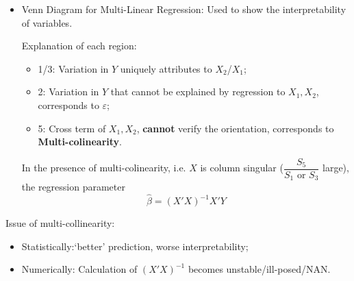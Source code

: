 \begin{itemize}[topsep=2pt,itemsep=2pt]
    \item Venn Diagram for Multi-Linear Regression: Used to show the interpretability of variables.
    
    \begin{center}
    \end{center}

    Explanation of each region:
    \begin{itemize}[topsep=2pt,itemsep=2pt]
        \item 1/3: Variation in $ Y $ uniquely attributes to $ X_2 $/$ X_1 $;
        \item 2: Variation in $ Y $ that cannot be explained by regression to $ X_1,X_2 $, corresponds to $ \varepsilon  $;
        \item 5: Cross term of $ X_1,X_2 $, \textbf{cannot} verify the orientation, corresponds to \textbf{Multi-colinearity}.
    \end{itemize}

    In the presence of multi-colinearity, i.e. $ X $ is column singular ($ \dfrac{S_5}{S_1\text{ or }S_3} $ large), the regression parameter
    \begin{equation}
        \hat{\beta }=(X'X)^{-1}X'Y
    \end{equation}

    
    
   
\end{itemize}

     Issue of multi-collinearity: 
    \begin{itemize}[topsep=2pt,itemsep=2pt]
        \item Statistically:`better' prediction, worse interpretability;
        \item Numerically: Calculation of $ (X'X)^{-1} $ becomes unstable/ill-posed/NAN.
    \end{itemize}

